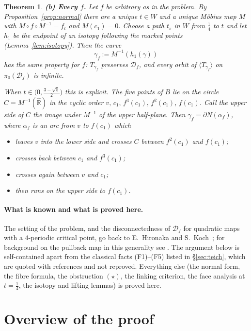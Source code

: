 \documentclass[11pt]{article}
\newtheorem{theorem}{Theorem}
\theoremstyle{definition}
\newcommand{\Rh}{\hat{\mathbb R}}
\newcommand{\D}{\mathcal D}
\begin{document}
\begin{theorem}
\smallskip
\textbf{(b) Every $f$.} Let $f$ be arbitrary as in the problem. By Proposition~\ref{prop:normal} there are a unique $t\in W$ and a unique M\"obius map $M$ with $M\circ f\circ M^{-1}=f_t$ and $M(c_1)=0$. Choose a path $t_s$ in $W$ from $\tfrac14$ to $t$ and let $h_1$ be the endpoint of an isotopy following the marked points (Lemma~\ref{lem:isotopy}). Then the curve
\[\gamma_f:=M^{-1}(h_1(\gamma))\]
has the same property for $f$: $T_{\gamma_f}$ preserves $\D_f$, and every orbit of $\langle T_{\gamma_f}\rangle$ on $\pi_0(\D_f)$ is infinite.

When $t\in\bigl(0,\tfrac{3-\sqrt5}{2}\bigr)$ this is explicit. The five points of $B$ lie on the circle $C=M^{-1}(\Rh)$ in the cyclic order $v,\,c_1,\,f^3(c_1),\,f^2(c_1),\,f(c_1)$. Call the \emph{upper} side of $C$ the image under $M^{-1}$ of the upper half-plane. Then $\gamma_f=\partial N(\alpha_f)$, where $\alpha_f$ is an arc from $v$ to $f(c_1)$ which
\begin{itemize}[nosep]
\item leaves $v$ into the lower side and crosses $C$ between $f^2(c_1)$ and $f(c_1)$;
\item crosses back between $c_1$ and $f^3(c_1)$;
\item crosses again between $v$ and $c_1$;
\item then runs on the upper side to $f(c_1)$.
\end{itemize}
\end{theorem}

\paragraph{What is known and what is proved here.} The setting of the problem, and the disconnectedness of $\D_f$ for quadratic maps with a $4$-periodic critical point, go back to E.~Hironaka and S.~Koch~\cite{HK}; for background on the pullback map in this generality see \cite{DH,BEKP}. The argument below is self-contained apart from the classical facts (F1)--(F5) listed in \S\ref{sec:teich}, which are quoted with references and not reproved. Everything else (the normal form, the fibre formula, the obstruction $(\star)$, the linking criterion, the face analysis at $t=\tfrac14$, the isotopy and lifting lemmas) is proved here.

\section{Overview of the proof}
\end{document}

